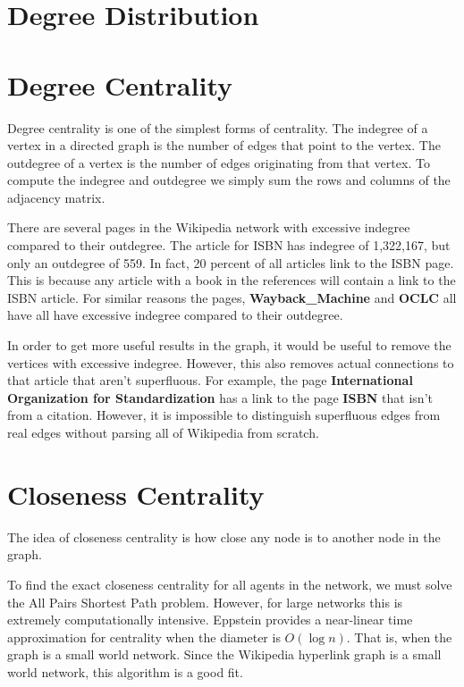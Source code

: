 \documentclass{article}
\begin{document}
\section{Degree Distribution}

\section{Degree Centrality}

Degree centrality is one of the simplest forms of centrality. The indegree of a vertex in a directed graph is the number of edges that point to the vertex. The outdegree of a vertex is the number of edges originating from that vertex.
To compute the indegree and outdegree we simply sum the rows and columns of the adjacency matrix.


There are several pages in the Wikipedia network with excessive indegree compared to their outdegree. The article for ISBN has indegree of 1,322,167, but only an outdegree of 559. In fact, 20 percent of all articles link to the ISBN page. This is because any article with a book in the references will contain a link to the ISBN article.
For similar reasons the pages, \textbf{Wayback\_Machine} and \textbf{OCLC} all have all have excessive indegree compared to their outdegree.

In order to get more useful results in the graph, it would be useful to remove the vertices with excessive indegree. However, this also removes actual connections to that article that aren't superfluous. For example, the page \textbf{International Organization for Standardization} has a link to the page \textbf{ISBN} that isn't from a citation. However, it is impossible to distinguish superfluous edges from real edges without parsing all of Wikipedia from scratch.

\section{Closeness Centrality}


The idea of closeness centrality is how close any node is to another node in the graph.

To find the exact closeness centrality for all agents in the network, we must solve the All Pairs Shortest Path problem. However, for large networks this is extremely computationally intensive. 
Eppstein provides a near-linear time approximation for centrality when the diameter is $O(\log n)$. That is, when the graph is a small world network. Since the Wikipedia hyperlink graph is a small world network, this algorithm is a good fit.
\end{document}
